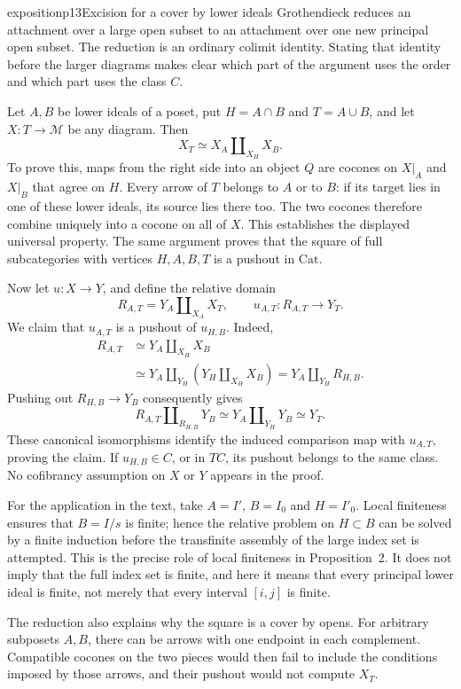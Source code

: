 \begin{dcomment}{exposition}{p13}{Excision for a cover by lower ideals}
Grothendieck reduces an attachment over a large open subset to an attachment over one new principal open subset. The reduction is an ordinary colimit identity. Stating that identity before the larger diagrams makes clear which part of the argument uses the order and which part uses the class $C$.

Let $A,B$ be lower ideals of a poset, put $H=A\cap B$ and $T=A\cup B$, and let $X:T\to\mathcal M$ be any diagram. Then
\[
 X_T\simeq X_A\amalg_{X_H}X_B.
\]
To prove this, maps from the right side into an object $Q$ are cocones on $X|_A$ and $X|_B$ that agree on $H$. Every arrow of $T$ belongs to $A$ or to $B$: if its target lies in one of these lower ideals, its source lies there too. The two cocones therefore combine uniquely into a cocone on all of $X$. This establishes the displayed universal property. The same argument proves that the square of full subcategories with vertices $H,A,B,T$ is a pushout in $\mathrm{Cat}$.

Now let $u:X\to Y$, and define the relative domain
\[
 R_{A,T}=Y_A\amalg_{X_A}X_T,
 \qquad u_{A,T}:R_{A,T}\longrightarrow Y_T.
\]
We claim that $u_{A,T}$ is a pushout of $u_{H,B}$. Indeed,
\[
\begin{split}
 R_{A,T}
 &\simeq Y_A\amalg_{X_H}X_B\\
 &\simeq Y_A\amalg_{Y_H}
             (Y_H\amalg_{X_H}X_B)
       =Y_A\amalg_{Y_H}R_{H,B}.
\end{split}
\]
Pushing out $R_{H,B}\to Y_B$ consequently gives
\[
 R_{A,T}\amalg_{R_{H,B}}Y_B
 \simeq Y_A\amalg_{Y_H}Y_B\simeq Y_T.
\]
These canonical isomorphisms identify the induced comparison map with $u_{A,T}$, proving the claim. If $u_{H,B}\in C$, or in $TC$, its pushout belongs to the same class. No cofibrancy assumption on $X$ or $Y$ appears in the proof.

For the application in the text, take $A=I'$, $B=I_0$ and $H=I'_0$. Local finiteness ensures that $B=I/s$ is finite; hence the relative problem on $H\subset B$ can be solved by a finite induction before the transfinite assembly of the large index set is attempted. This is the precise role of local finiteness in Proposition~2. It does not imply that the full index set is finite, and here it means that every principal lower ideal is finite, not merely that every interval $[i,j]$ is finite.

The reduction also explains why the square is a cover by opens. For arbitrary subposets $A,B$, there can be arrows with one endpoint in each complement. Compatible cocones on the two pieces would then fail to include the conditions imposed by those arrows, and their pushout would not compute $X_T$.
\end{dcomment}

